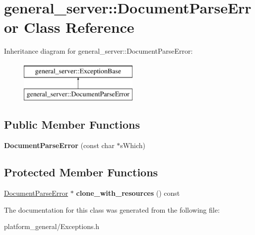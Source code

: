 \hypertarget{classgeneral__server_1_1DocumentParseError}{\section{general\-\_\-server\-:\-:\-Document\-Parse\-Error \-Class \-Reference}
\label{classgeneral__server_1_1DocumentParseError}
}
\-Inheritance diagram for general\-\_\-server\-:\-:\-Document\-Parse\-Error\-:\begin{figure}[H]
\begin{center}
\leavevmode
\includegraphics[height=2.000000cm]{classgeneral__server_1_1DocumentParseError}
\end{center}
\end{figure}
\subsection*{\-Public \-Member \-Functions}
\begin{DoxyCompactItemize}
\item 
\hypertarget{classgeneral__server_1_1DocumentParseError_a0826941f13648f30b2a7f20c5c6a8787}{{\bfseries \-Document\-Parse\-Error} (const char $\ast$s\-Which)}\label{classgeneral__server_1_1DocumentParseError_a0826941f13648f30b2a7f20c5c6a8787}

\end{DoxyCompactItemize}
\subsection*{\-Protected \-Member \-Functions}
\begin{DoxyCompactItemize}
\item 
\hypertarget{classgeneral__server_1_1DocumentParseError_a237e82388f3f6d81ec86e2593a6f51df}{\hyperlink{classgeneral__server_1_1DocumentParseError}{\-Document\-Parse\-Error} $\ast$ {\bfseries clone\-\_\-with\-\_\-resources} () const }\label{classgeneral__server_1_1DocumentParseError_a237e82388f3f6d81ec86e2593a6f51df}

\end{DoxyCompactItemize}


\-The documentation for this class was generated from the following file\-:\begin{DoxyCompactItemize}
\item 
platform\-\_\-general/\-Exceptions.\-h\end{DoxyCompactItemize}
